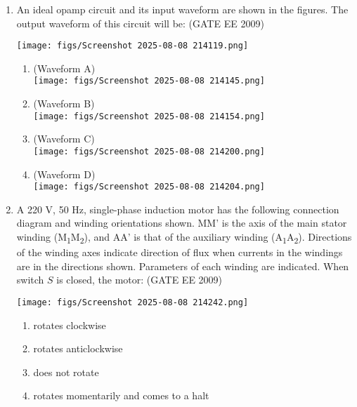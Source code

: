 \documentclass[journal,12pt,onecolumn]{IEEEtran}
\theoremstyle{remark}
\begin{document}
\begin{flushleft}
\begin{enumerate}
\item An ideal opamp circuit and its input waveform are shown in the figures. The output waveform of this circuit will be:
\hfill(GATE EE 2009)

\begin{center}
    \texttt{[image: figs/Screenshot 2025-08-08 214119.png]}
  \label{fig:placeholder}

\end{center}

\begin{enumerate}
    \item (Waveform A) \\
    \texttt{[image: figs/Screenshot 2025-08-08 214145.png]}
    \item (Waveform B) \\
    \texttt{[image: figs/Screenshot 2025-08-08 214154.png]}
    \item (Waveform C) \\
    \texttt{[image: figs/Screenshot 2025-08-08 214200.png]}
    \item (Waveform D) \\
    \texttt{[image: figs/Screenshot 2025-08-08 214204.png]}
\end{enumerate}

\item A 220 V, 50 Hz, single-phase induction motor has the following connection diagram and winding orientations shown. MM' is the axis of the main stator winding (M\textsubscript{1}M\textsubscript{2}), and AA' is that of the auxiliary winding (A\textsubscript{1}A\textsubscript{2}). Directions of the winding axes indicate direction of flux when currents in the windings are in the directions shown. Parameters of each winding are indicated. When switch $S$ is closed, the motor:
\hfill(GATE EE 2009)
\begin{center}
\centering
    \texttt{[image: figs/Screenshot 2025-08-08 214242.png]}
    \label{fig:placeholder}

\end{center}

\begin{enumerate}
    \item rotates clockwise
    \item rotates anticlockwise
    \item does not rotate
    \item rotates momentarily and comes to a halt
\end{enumerate}





\end{enumerate}
\end{flushleft}
\end{document}
